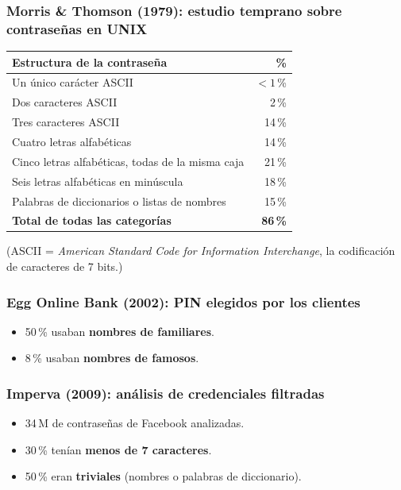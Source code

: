 \documentclass[11pt,a4paper]{report}
\begin{document}
\subsubsection*{Morris \& Thomson (1979): estudio temprano sobre contraseñas en UNIX}
 
\begin{center}
\small
{\renewcommand{\arraystretch}{1.2}%
\begin{tabular}{l r}
\toprule
\textbf{Estructura de la contraseña} & \textbf{\%} \\
\midrule
Un único carácter ASCII & $<1$\,\% \\
Dos caracteres ASCII & 2\,\% \\
Tres caracteres ASCII & 14\,\% \\
Cuatro letras alfabéticas & 14\,\% \\
Cinco letras alfabéticas, todas de la misma caja & 21\,\% \\
Seis letras alfabéticas en minúscula & 18\,\% \\
Palabras de diccionarios o listas de nombres & 15\,\% \\
\midrule
\textbf{Total de todas las categorías} & \textbf{86\,\%} \\
\bottomrule
\end{tabular}}
\end{center}
(ASCII = \emph{American Standard Code for Information Interchange}, la codificación de caracteres de 7 bits.)
 
\subsubsection*{Egg Online Bank (2002): PIN elegidos por los clientes}
\begin{itemize}
  \item 50\,\% usaban \textbf{nombres de familiares}.
  \item 8\,\% usaban \textbf{nombres de famosos}.
\end{itemize}
 
\subsubsection*{Imperva (2009): análisis de credenciales filtradas}
\begin{itemize}
  \item 34\,M de contraseñas de Facebook analizadas.
  \item 30\,\% tenían \textbf{menos de 7 caracteres}.
  \item 50\,\% eran \textbf{triviales} (nombres o palabras de diccionario).
\end{itemize}
 
\end{document}
